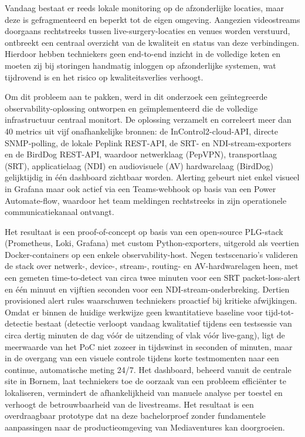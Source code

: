 Vandaag bestaat er reeds lokale monitoring op de afzonderlijke locaties, maar deze is gefragmenteerd en beperkt tot de eigen omgeving. Aangezien videostreams doorgaans rechtstreeks tussen live-surgery-locaties en venues worden verstuurd, ontbreekt een centraal overzicht van de kwaliteit en status van deze verbindingen. Hierdoor hebben techniekers geen end-to-end inzicht in de volledige keten en moeten zij bij storingen handmatig inloggen op afzonderlijke systemen, wat tijdrovend is en het risico op kwaliteitsverlies verhoogt.

Om dit probleem aan te pakken, werd in dit onderzoek een geïntegreerde observability-oplossing ontworpen en geïmplementeerd die de volledige infrastructuur centraal monitort. De oplossing verzamelt en correleert meer dan 40 metrics uit vijf onafhankelijke bronnen: de InControl2-cloud-API, directe SNMP-polling, de lokale Peplink REST-API, de SRT- en NDI-stream-exporters en de BirdDog REST-API, waardoor netwerklaag (PepVPN), transportlaag (SRT), applicatielaag (NDI) en audiovisuele (AV) hardwarelaag (BirdDog) gelijktijdig in één dashboard zichtbaar worden. Alerting gebeurt niet enkel visueel in Grafana maar ook actief via een Teams-webhook op basis van een Power Automate-flow, waardoor het team meldingen rechtstreeks in zijn operationele communicatiekanaal ontvangt.

Het resultaat is een proof-of-concept op basis van een open-source PLG-stack (Prometheus, Loki, Grafana) met custom Python-exporters, uitgerold als veertien Docker-containers op een enkele observability-host. Negen testscenario's valideren de stack over netwerk-, device-, stream-, routing- en AV-hardwarelagen heen, met een gemeten time-to-detect van circa twee minuten voor een SRT packet-loss-alert en één minuut en vijftien seconden voor een NDI-stream-onderbreking. Dertien provisioned alert rules waarschuwen techniekers proactief bij kritieke afwijkingen. Omdat er binnen de huidige werkwijze geen kwantitatieve baseline voor tijd-tot-detectie bestaat (detectie verloopt vandaag kwalitatief tijdens een testsessie van circa dertig minuten de dag vóór de uitzending of vlak vóór live-gang), ligt de meerwaarde van het PoC niet zozeer in tijdswinst in seconden of minuten, maar in de overgang van een visuele controle tijdens korte testmomenten naar een continue, automatische meting 24/7. Het dashboard, beheerd vanuit de centrale site in Bornem, laat techniekers toe de oorzaak van een probleem efficiënter te lokaliseren, vermindert de afhankelijkheid van manuele analyse per toestel en verhoogt de betrouwbaarheid van de livestreams. Het resultaat is een overdraagbaar prototype dat na deze bachelorproef zonder fundamentele aanpassingen naar de productieomgeving van Mediaventures kan doorgroeien.
